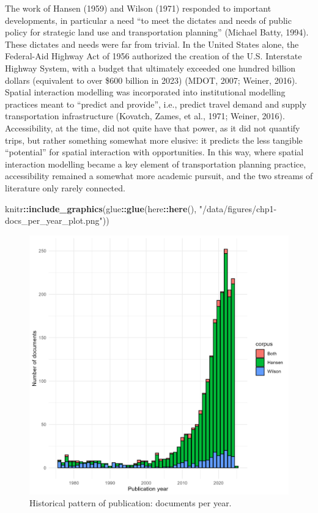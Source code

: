 \documentclass[
11pt, %
oneside, %
english, %
singlespacing, %
]{macthesis} %
\newenvironment{Shaded}{\begin{snugshade}}{\end{snugshade}}
\newcommand{\FunctionTok}[1]{\textcolor[rgb]{0.13,0.29,0.53}{\textbf{#1}}}
\newcommand{\NormalTok}[1]{#1}
\newcommand{\SpecialCharTok}[1]{\textcolor[rgb]{0.81,0.36,0.00}{\textbf{#1}}}
\newcommand{\StringTok}[1]{\textcolor[rgb]{0.31,0.60,0.02}{#1}}
\begin{document}
The work of Hansen (1959) and Wilson (1971) responded to important developments, in particular a need ``to meet the dictates and needs of public policy for strategic land use and transportation planning'' (Michael Batty, 1994). These dictates and needs were far from trivial. In the United States alone, the Federal-Aid Highway Act of 1956 authorized the creation of the U.S. Interstate Highway System, with a budget that ultimately exceeded one hundred billion dollars (equivalent to over \$600 billion in 2023) (MDOT, 2007; Weiner, 2016). Spatial interaction modelling was incorporated into institutional modelling practices meant to ``predict and provide'', i.e., predict travel demand and supply transportation infrastructure (Kovatch, Zames, et al., 1971; Weiner, 2016). Accessibility, at the time, did not quite have that power, as it did not quantify trips, but rather something somewhat more elusive: it predicts the less tangible ``potential'' for spatial interaction with opportunities. In this way, where spatial interaction modelling became a key element of transportation planning practice, accessibility remained a somewhat more academic pursuit, and the two streams of literature only rarely connected.

\begin{Shaded}
\begin{Highlighting}[]
\NormalTok{knitr}\SpecialCharTok{::}\FunctionTok{include\_graphics}\NormalTok{(glue}\SpecialCharTok{::}\FunctionTok{glue}\NormalTok{(here}\SpecialCharTok{::}\FunctionTok{here}\NormalTok{(),}
                                   \StringTok{"/data/figures/chp1{-}docs\_per\_year\_plot.png"}\NormalTok{))}
\end{Highlighting}
\end{Shaded}

\begin{figure}
\includegraphics[width=0.7\linewidth]{data/figures/chp1-docs_per_year_plot} \caption{Historical pattern of publication: documents per year.}\label{fig:fig-docs-per-year}
\end{figure}
\end{document}
